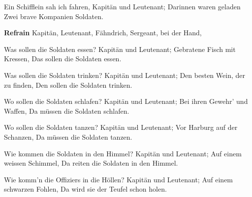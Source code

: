 \footnotemark [
ititle={Schifflein sah ich fahren, ein}]


\beginverse
Ein Schifflein sah ich fahren,
Kapitän und Leutenant;
Darinnen waren geladen
Zwei brave Kompanien Soldaten.
\endverse

\beginchorus
\textbf{Refrain}
Kapitän, Leutenant, Fähndrich, Sergeant,
 bei der Hand,
\endchorus

\beginverse
Was sollen die Soldaten essen?
Kapitän und Leutenant;
Gebratene Fisch mit Kressen,
Das sollen die Soldaten essen.
\endverse

\beginverse
Was sollen die Soldaten trinken?
Kapitän und Leutenant;
Den besten Wein, der zu finden,
Den sollen die Soldaten trinken.
\endverse

\beginverse
Wo sollen die Soldaten schlafen?
Kapitän und Leutenant;
Bei ihren Gewehr' und Waffen,
Da müssen die Soldaten schlafen.
\endverse

\beginverse
Wo sollen die Soldaten tanzen?
Kapitän und Leutenant;
Vor Harburg auf der Schanzen,
Da müssen die Soldaten tanzen.
\endverse

\beginverse
Wie kommen die Soldaten in den Himmel?
Kapitän und Leutenant;
Auf einem weissen Schimmel,
Da reiten die Soldaten in den Himmel.
\endverse

\beginverse
Wie komm'n die Offiziers in die Höllen?
Kapitän und Leutenant;
Auf einem schwarzen Fohlen,
Da wird sie der Teufel schon holen.
\endverse
\endsong
